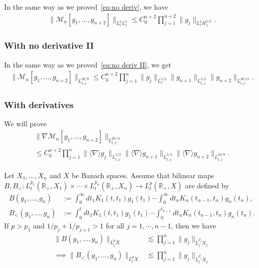 \documentclass[AHL,Unicode,longabstracts,MathTools,published]{cedram}
\newcommand{\BR}{\mathbb{R}}
\newcommand{\CM}{\mathcal{M}}
\newcommand{\I}{\infty}
\newcommand{\sd}{\langle \nabla \rangle}
\newcommand{\tx}{{t,x}}
\newcommand{\na}{\nabla}
\newcommand{\ls}{\lesssim}
\begin{document}
In the same way as we proved~\eqref{eq:no deriv}, we have
\begin{align}\label{eq:with no deriv b I}
\|\CM_n[g_1,\dots,g_{n+2}]\|_{L^2_t L^2_x} \le C_0^{n+2} \prod_{j=1}^{n+2} \|g_j\|_{L^2_t H^{1/2}_x}.
\end{align}

\subsubsection{With no derivative II} 

In the same way as we proved~\eqref{eq:no deriv II}, we get
\begin{align}\label{eq:with no deriv b II}
\|\CM_n[g_1,\dots,g_{n+2}]\|_{L^{20/9}_\tx}
\le C_0^{n+2} \prod_{j=1}^{n}
\|g_j\|_{L^{5/2}_x}
\|g_{n+1}\|_{L^{5/2}_\tx}
\|g_{n+2}\|_{L^{20/11}_\tx}.
\end{align}


\subsubsection{With derivatives} 

We will prove
\begin{multline}\label{eq:with deriv b}
\|\na \CM_n[g_1,\dots,g_{n+2}]\|_{L^{20/11}_\tx}
\\
\le C_0^{n+2} \prod_{j=1}^{n}
\|\sd g_j\|_{L^{5/3}_\tx}
\|\sd g_{n+1}\|_{L^{5/3}_\tx}
\|\sd g_{n+2}\|_{L^{20/9}_\tx}.
\end{multline}

\begin{lemm}\label{lem:MCK}
Let $X_1, \dots, X_n$ and $X$ be Banach spaces. Assume that bilinear maps $B,B_<:L^{p_1}_t(\BR_+,X_1) \times \cdots \times L^{p_n}_t(\BR_+,X_n) \to L^p_t(\BR_+,X)$ are defined by
\begin{align}
B(g_1,\dots, g_n) &:= \int_0^\I dt_1 K_1(t,t_1)g_1(t_1) \cdots \int_0^\I dt_n K_n(t_{n-1},t_n)g_n(t_n), \\
B_<(g_1, \dots, g_n) &:= \int_0^t dt_1 K_1(t,t_1)g_1(t_1) \cdots \int_0^{t_{n-1}} dt_n K_n(t_{n-1},t_n)g_n(t_n).
\end{align}
If $p>p_1$ and $1/p_j+1/p_{j+1} > 1$ for all $j=1,\cdots,n-1$, then we have
\begin{equation}
\begin{split}
\|B(g_1,\dots,g_n)\|_{L^p_t X}
&\ls \prod_{j=1}^n \|g_j\|_{L^{p_j}_t X_j}\\
\implies
\|B_<(g_1,\dots,g_n)\|_{L^p_t X}
&\ls \prod_{j=1}^n \|g_j\|_{L^{p_j}_t X_j}
\end{split}
\end{equation}
\end{lemm}
\end{document}
